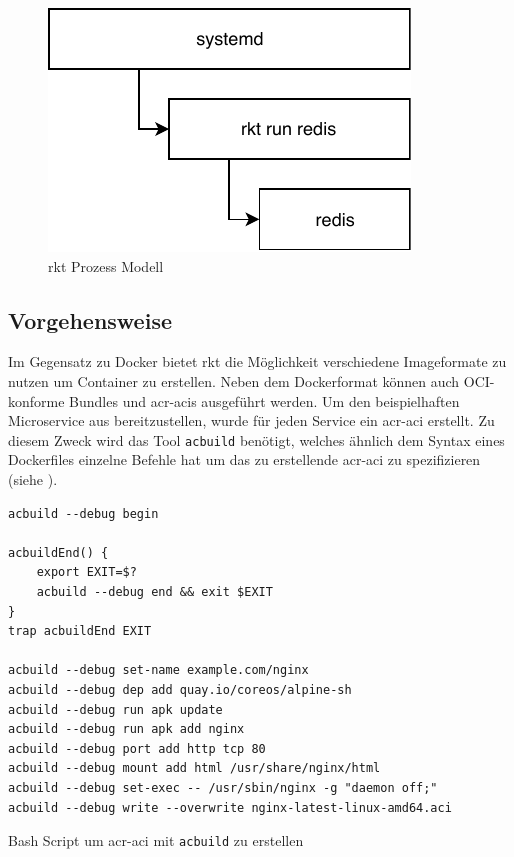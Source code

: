 \begin{figure}[h]
	\begin{center}
		\includegraphics[scale=0.9]{bilder/rkt-process.pdf}
		\caption{rkt Prozess Modell \citep{RktVsOtherProjects}}
		\label{fig:rktProcessModell}		
	\end{center}
\end{figure}


\subsection{Vorgehensweise}
\label{sec:compRktVorgehen}

Im Gegensatz zu Docker bietet rkt die Möglichkeit verschiedene Imageformate zu nutzen um Container zu erstellen. Neben dem Dockerformat können auch OCI-konforme Bundles und \glspl{acr-aci} ausgeführt werden. Um den beispielhaften Microservice aus  bereitzustellen, wurde für jeden Service ein \gls{acr-aci} erstellt. Zu diesem Zweck wird das Tool \texttt{acbuild} benötigt, welches ähnlich dem Syntax eines Dockerfiles einzelne Befehle hat um das zu erstellende \gls{acr-aci} zu spezifizieren (siehe ).

\begin{listing}[h]
	\begin{verbatim}
acbuild --debug begin

acbuildEnd() {
	export EXIT=$?
	acbuild --debug end && exit $EXIT 
}
trap acbuildEnd EXIT

acbuild --debug set-name example.com/nginx
acbuild --debug dep add quay.io/coreos/alpine-sh
acbuild --debug run apk update
acbuild --debug run apk add nginx
acbuild --debug port add http tcp 80
acbuild --debug mount add html /usr/share/nginx/html
acbuild --debug set-exec -- /usr/sbin/nginx -g "daemon off;"
acbuild --debug write --overwrite nginx-latest-linux-amd64.aci
	\end{verbatim}
	\caption{Bash Script um \gls{acr-aci} mit \texttt{acbuild} zu erstellen \citep{AppContainer}}
	\label{lst:acbuildCommands}
\end{listing}

